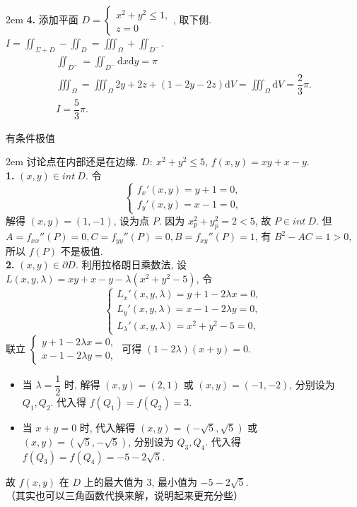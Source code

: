 \documentclass[UTF8,14pt,normal]{ctexart}
\begin{document}
    \hangindent 2em
    \noindent
    \textbf{4.} 添加平面 \(D = \begin{cases}
        x^2 + y^2 \leqslant 1, \\
        z = 0
    \end{cases}\), 取下侧. \(I = \iint_{\Sigma + D} - \iint_{D} = \iiint_{\Omega} + \iint_{D^-}\). 
    \begin{gather*}
        \iint_{D^-} = \iint_{D^-} \mathrm{d} x \mathrm{d} y = \pi \\
        \iiint_{\Omega} = \iiint_{\Omega} 2y + 2z + (1 - 2y - 2z) \mathrm{d} V = \iiint_{\Omega} \mathrm{d} V = \dfrac{2}{3} \pi. \\
        I = \dfrac{5}{3} \pi.
    \end{gather*}

 有条件极值

    \hangindent 2em
    \noindent
    讨论点在内部还是在边缘. \(D: \ x^2 + y^2 \leqslant 5\), \(f(x, y) = xy + x - y\). \\
    \textbf{1.} \((x, y) \in int \ D\). 令
    \[  
        \begin{cases}
            f_x'(x, y) = y + 1 = 0, \\
            f_y'(x, y) = x - 1 = 0,
        \end{cases}
    \]
    解得 \((x, y) = (1, -1)\), 设为点 \(P\). 因为 \(x_p^2 + y_p^2 = 2 < 5\), 故 \(P \in int \ D\). 但 \(A = f_{xx}''(P) = 0, C = f_{yy}''(P) = 0, B = f_{xy}''(P) = 1\), 有 \(B^2 - AC = 1 > 0\), 所以 \(f(P)\) 不是极值. \\
    \textbf{2.} \((x, y) \in \partial D\). 利用拉格朗日乘数法, 设 \(L(x, y, \lambda) = xy + x - y - \lambda(x^2 + y^2 - 5)\), 令
    \[
        \begin{cases}
            L_x'(x, y, \lambda) = y + 1 - 2\lambda x = 0, \\
            L_y'(x, y, \lambda) = x - 1 - 2\lambda y = 0, \\
            L_\lambda'(x, y, \lambda) = x^2 + y^2 - 5 = 0,
        \end{cases}
    \]
    联立 \(\begin{cases}
        y + 1 - 2\lambda x = 0, \\
        x - 1 - 2\lambda y = 0,
        \end{cases}\) 可得 \((1 - 2\lambda)(x + y) = 0\).
    \begin{itemize}
        \item 当 \(\lambda = \dfrac{1}{2}\) 时, 解得 \((x, y) = (2, 1)\) 或 \((x, y) = (-1, -2)\), 分别设为 \(Q_1, Q_2\). 代入得 \(f(Q_1) = f(Q_2) = 3\). 
        \item 当 \(x + y = 0\) 时, 代入解得 \((x, y) = (-\sqrt{5}, \sqrt{5})\) 或 \((x, y) = (\sqrt{5}, -\sqrt{5})\), 分别设为 \(Q_3, Q_4\). 代入得 \(f(Q_3) = f(Q_4) = -5 - 2\sqrt{5}\).
    \end{itemize}
    故 \(f(x, y)\) 在 \(D\) 上的最大值为 \(3\), 最小值为 \(-5 - 2\sqrt{5}\). \\
    （其实也可以三角函数代换来解，说明起来更充分些）
\end{document}
